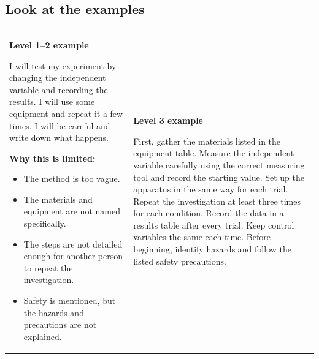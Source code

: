 \documentclass[12pt]{article}
\begin{document}

\subsection*{Look at the examples}

\begin{tabularx}{\textwidth}{>{\raggedright\arraybackslash}X >{\raggedright\arraybackslash}X}

\begin{minipage}[t]{\linewidth}
\textbf{Level 1--2 example}

\begin{draftbox}
I will test my experiment by changing the independent variable and recording the results. I will use some equipment and repeat it a few times. I will be careful and write down what happens.
\end{draftbox}

\textbf{Why this is limited:}

\begin{itemize}[leftmargin=1.5em]
    \item The method is too vague.
    \item The materials and equipment are not named specifically.
    \item The steps are not detailed enough for another person to repeat the investigation.
    \item Safety is mentioned, but the hazards and precautions are not explained.
\end{itemize}
\end{minipage}

&
\begin{minipage}[t]{\linewidth}
\textbf{Level 3 example}

\begin{draftbox}
First, gather the materials listed in the equipment table. Measure the independent variable carefully using the correct measuring tool and record the starting value. Set up the apparatus in the same way for each trial. Repeat the investigation at least three times for each condition. Record the data in a results table after every trial. Keep control variables the same each time. Before beginning, identify hazards and follow the listed safety precautions.
\end{draftbox}
\end{minipage}

\\
\end{tabularx}
\end{document}
